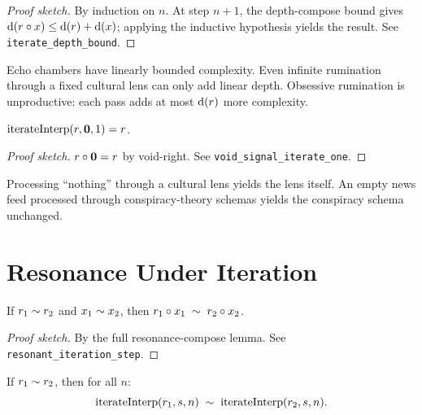 \begin{proof}[Proof sketch]
By induction on $n$.  At step $n+1$, the depth-compose bound gives
$\operatorname{d}(r \circ x) \leq \operatorname{d}(r) + \operatorname{d}(x)$; applying the
inductive hypothesis yields the result.
See \texttt{iterate\_depth\_bound}.
\end{proof}

\begin{remark}
Echo chambers have linearly bounded complexity.  Even infinite
rumination through a fixed cultural lens can only add linear depth.
Obsessive rumination is unproductive: each pass adds at most $\operatorname{d}(r)$
more complexity.
\end{remark}

\begin{theorem}
\label{thm:void-signal-iterate}
$\operatorname{iterateInterp}(r, \mathbf{0}, 1) = r$.
\end{theorem}

\begin{proof}[Proof sketch]
$r \circ \mathbf{0} = r$ by void-right.
See \texttt{void\_signal\_iterate\_one}.
\end{proof}

\begin{remark}
Processing ``nothing'' through a cultural lens yields the lens itself.
An empty news feed processed through conspiracy-theory schemas yields
the conspiracy schema unchanged.
\end{remark}

\section{Resonance Under Iteration}
\label{sec:ch5:resonance-iter}

\begin{theorem}
\label{thm:resonant-step}
If $r_1 \sim r_2$ and $x_1 \sim x_2$, then
$r_1 \circ x_1 \;\sim\; r_2 \circ x_2$.
\end{theorem}

\begin{proof}[Proof sketch]
By the full resonance-compose lemma.
See \texttt{resonant\_iteration\_step}.
\end{proof}

\begin{theorem}
\label{thm:full-resonant-iteration}
If $r_1 \sim r_2$, then for all $n$:
\[
  \operatorname{iterateInterp}(r_1, s, n)
  \;\sim\;
  \operatorname{iterateInterp}(r_2, s, n).
\]
\end{theorem}

